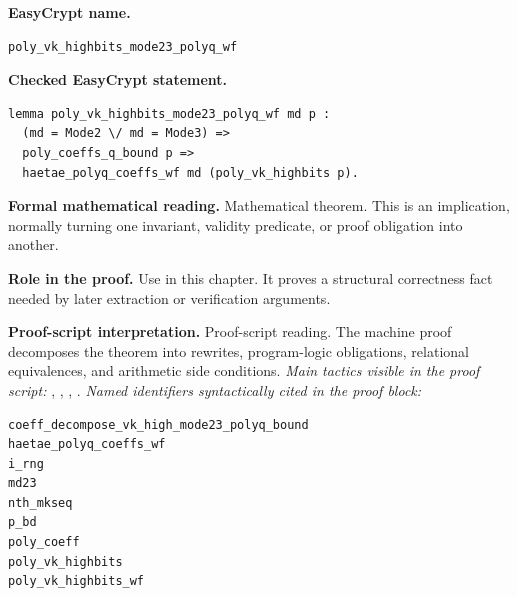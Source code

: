 \begin{formaltheorem}
\noindent\textbf{EasyCrypt name.}
\begin{lstlisting}[language=EasyCrypt,basicstyle=\ttfamily\scriptsize]
poly_vk_highbits_mode23_polyq_wf
\end{lstlisting}
\noindent\textbf{Checked EasyCrypt statement.}
\begin{lstlisting}[language=EasyCrypt,basicstyle=\ttfamily\scriptsize]
lemma poly_vk_highbits_mode23_polyq_wf md p :
  (md = Mode2 \/ md = Mode3) =>
  poly_coeffs_q_bound p =>
  haetae_polyq_coeffs_wf md (poly_vk_highbits p).
\end{lstlisting}
\noindent\textbf{Formal mathematical reading.}
Mathematical theorem. This is an implication, normally turning one invariant, validity predicate, or proof obligation into another.

\noindent\textbf{Role in the proof.}
Use in this chapter. It proves a structural correctness fact needed by later extraction or verification arguments.

\noindent\textbf{Proof-script interpretation.}
Proof-script reading. The machine proof decomposes the theorem into rewrites, program-logic obligations, relational equivalences, and arithmetic side conditions.
\emph{Main tactics visible in the proof script:} , , , .
\emph{Named identifiers syntactically cited in the proof block:}
\begin{lstlisting}[language=EasyCrypt,basicstyle=\ttfamily\scriptsize]
coeff_decompose_vk_high_mode23_polyq_bound
haetae_polyq_coeffs_wf
i_rng
md23
nth_mkseq
p_bd
poly_coeff
poly_vk_highbits
poly_vk_highbits_wf
\end{lstlisting}

\end{formaltheorem}

